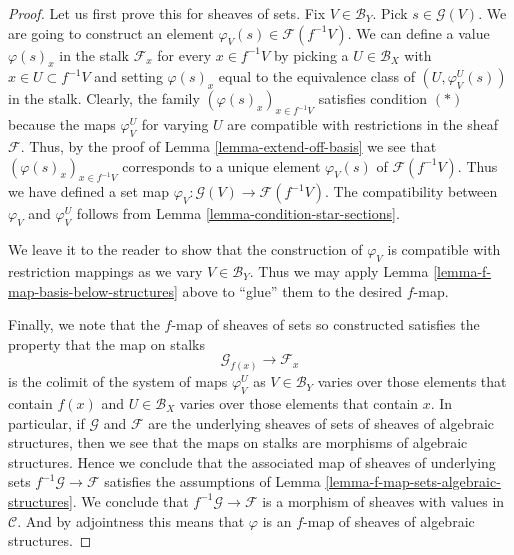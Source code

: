 \begin{proof}
Let us first prove this for sheaves of sets.
Fix $V \in \mathcal{B}_Y$. Pick $s \in \mathcal{G}(V)$.
We are going to construct an element
$\varphi_V(s) \in \mathcal{F}(f^{-1}V)$.
We can define a value $\varphi(s)_x$ in the stalk $\mathcal{F}_x$
for every $x \in f^{-1}V$ by picking a $U \in \mathcal{B}_X$
with $x \in U \subset f^{-1}V$ and setting $\varphi(s)_x$
equal to the equivalence class of $(U, \varphi_V^U(s))$
in the stalk. Clearly, the family $(\varphi(s)_x)_{x \in f^{-1}V}$
satisfies condition $(*)$ because the maps $\varphi_V^U$
for varying $U$
are compatible with restrictions in the sheaf $\mathcal{F}$.
Thus, by the proof of Lemma \ref{lemma-extend-off-basis}
we see that $(\varphi(s)_x)_{x \in f^{-1}V}$ corresponds
to a unique element $\varphi_V(s)$ of $\mathcal{F}(f^{-1}V)$.
Thus we have defined a set map
$\varphi_V : \mathcal{G}(V) \to \mathcal{F}(f^{-1}V)$.
The compatibility between $\varphi_V$ and $\varphi_V^U$
follows from Lemma \ref{lemma-condition-star-sections}.

\medskip\noindent
We leave it to the reader to show that the construction
of $\varphi_V$ is compatible with restriction mappings as we vary
$V \in \mathcal{B}_Y$. Thus we may apply Lemma
\ref{lemma-f-map-basis-below-structures} above to
``glue'' them to the desired $f$-map.

\medskip\noindent
Finally, we note that the $f$-map of sheaves of sets so constructed
satisfies the property that the map on stalks
$$
\mathcal{G}_{f(x)} \longrightarrow \mathcal{F}_x
$$
is the colimit of the system of maps $\varphi_V^U$ as
$V \in \mathcal{B}_Y$ varies over those elements that
contain $f(x)$ and $U \in \mathcal{B}_X$ varies over those elements that
contain $x$. In particular, if $\mathcal{G}$ and $\mathcal{F}$
are the underlying sheaves of sets of sheaves of algebraic structures,
then we see that the maps on stalks are morphisms of algebraic
structures. Hence we conclude that the associated map of
sheaves of underlying sets $f^{-1}\mathcal{G} \to \mathcal{F}$
satisfies the assumptions of
Lemma \ref{lemma-f-map-sets-algebraic-structures}.
We conclude that $f^{-1}\mathcal{G} \to \mathcal{F}$
is a morphism of sheaves with values in $\mathcal{C}$.
And by adjointness this means that $\varphi$ is
an $f$-map of sheaves of algebraic structures.
\end{proof}

